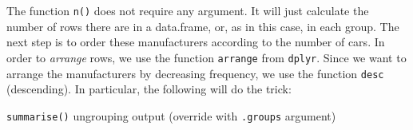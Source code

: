 \documentclass[]{tufte-book}
\newenvironment{Shaded}{}{}
\newcommand{\DataTypeTok}[1]{\textcolor[rgb]{0.56,0.13,0.00}{#1}}
\newcommand{\KeywordTok}[1]{\textcolor[rgb]{0.00,0.44,0.13}{\textbf{#1}}}
\newcommand{\NormalTok}[1]{#1}
\newcommand{\OperatorTok}[1]{\textcolor[rgb]{0.40,0.40,0.40}{#1}}
\newcommand{\StringTok}[1]{\textcolor[rgb]{0.25,0.44,0.63}{#1}}
\begin{document}
The function \texttt{n()} does not require any argument. It will just calculate the number of rows there are in a data.frame, or, as in this case, in each group. The next step is to order these manufacturers according to the number of cars. In order to \emph{arrange} rows, we use the function \texttt{arrange} from \texttt{dplyr}. Since we want to arrange the manufacturers by decreasing frequency, we use the function \texttt{desc} (descending). In particular, the following will do the trick:

\begin{Shaded}
\end{Shaded}

\texttt{summarise()} ungrouping output (override with \texttt{.groups} argument)
\end{document}
